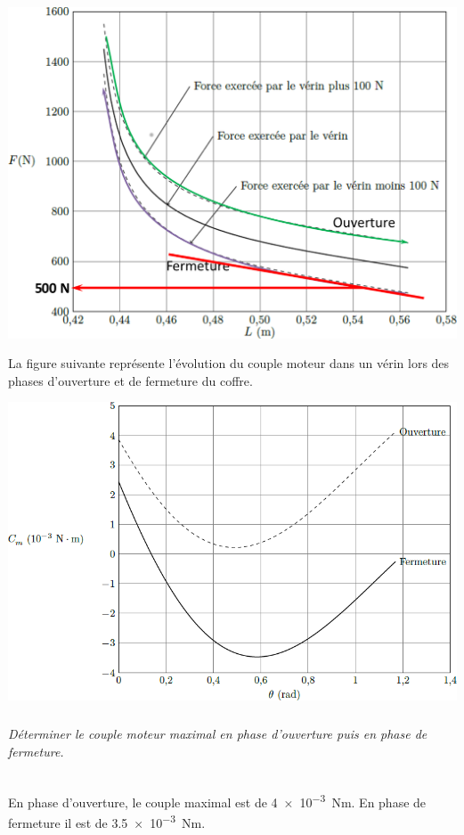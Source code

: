 \documentclass[10pt,fleqn]{article} %
\begin{document}
\begin{multicols}{2}
\begin{multicols}{2}
\begin{corrige}
\end{corrige}
\begin{center}
\includegraphics[width=\linewidth]{images/cor_05}
\end{center}
\else
\fi

\ifprof
\else
La figure suivante représente l’évolution du couple moteur dans un vérin lors des phases d’ouverture et de fermeture
du coffre.

\begin{center}
\includegraphics[width=.9\linewidth]{images/fig_04}
\end{center}
\fi

\subparagraph{}
\textit{Déterminer le couple moteur maximal en phase d’ouverture puis en phase de fermeture.}
\ifprof
\begin{corrige}~\\
En phase d'ouverture, le couple maximal est de \SI{4e-3}{Nm}. En phase de fermeture il est de \SI{3,5e-3}{Nm}.
\end{corrige}
\else
\fi




\end{multicols}
\end{multicols}
\end{document}
